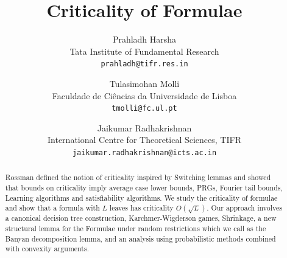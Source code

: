 \documentclass[11pt]{article}
\title{Criticality of \demorgan Formulae}
\author{
    Prahladh Harsha \\
    \small Tata Institute of Fundamental Research \\
    \small \texttt{prahladh@tifr.res.in}
    \and
    Tulasimohan Molli \\
    \small Faculdade de Ciências da Universidade de Lisboa \\
    \small \texttt{tmolli@fc.ul.pt}
    \and
    Jaikumar Radhakrishnan \\
    \small International Centre for Theoretical Sciences, TIFR \\
    \small \texttt{jaikumar.radhakrishnan@icts.ac.in}
}
\date{}
\begin{document}
\maketitle

\begin{abstract}
    Rossman defined the notion of criticality inspired by Switching lemmas and showed that bounds on criticality imply  average case lower bounds, PRGs, Fourier tail bounds, Learning algorithms and satisfiability algorithms.   
    We study the criticality of \demorgan formulae and show that a \demorgan formula with $L$ leaves has criticality $O(\sqrt{L})$. Our approach involves a canonical decision tree construction, Karchmer-Wigderson games, Shrinkage, a new structural lemma for the Formulae under random restrictions which we call as the Banyan decomposition lemma, and an analysis using probabilistic methods combined with convexity arguments.   
\end{abstract}

\tableofcontents

\newpage





\end{document}
